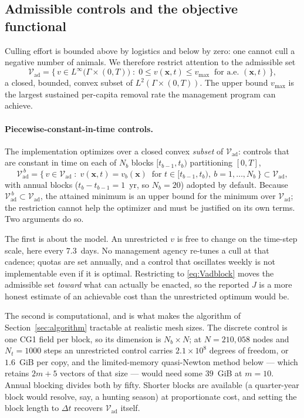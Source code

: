 \documentclass[11pt]{article}
\newcommand{\Vad}{\mathcal{V}_{\mathrm{ad}}}
\begin{document}
\subsection{Admissible controls and the objective functional}

Culling effort is bounded above by logistics and below by zero: one cannot cull a negative number of animals. We therefore restrict attention to the admissible set
\begin{equation}
\Vad = \Big\{\,v\in L^\infty\big(\Gamma\times(0,T)\big)\;:\;0\le v(\mathbf{x},t)\le v_{\max}\ \text{ for a.e. }(\mathbf{x},t)\,\Big\},
\end{equation}
a closed, bounded, convex subset of $L^2(\Gamma\times(0,T))$. The upper bound $v_{\max}$ is the largest sustained per-capita removal rate the management program can achieve.

\paragraph{Piecewise-constant-in-time controls.} The implementation optimizes over a closed convex \emph{subset} of $\Vad$: controls that are constant in time on each of $N_b$ blocks $[t_{b-1},t_b)$ partitioning $[0,T]$,
\begin{equation}
\Vad^{\,b} = \Big\{\,v\in\Vad \;:\; v(\mathbf{x},t) = v_b(\mathbf{x})\ \text{ for } t\in[t_{b-1},t_b),\ b=1,\dots,N_b \,\Big\} \subset \Vad,
\label{eq:Vadblock}
\end{equation}
with annual blocks ($t_b - t_{b-1} = 1$~yr, so $N_b = 20$) adopted by default. Because $\Vad^{\,b}\subset\Vad$, the attained minimum is an upper bound for the minimum over $\Vad$; the restriction cannot help the optimizer and must be justified on its own terms. Two arguments do so.

The first is about the model. An unrestricted $v$ is free to change on the time-step scale, here every $7.3$~days. No management agency re-tunes a cull at that cadence; quotas are set annually, and a control that oscillates weekly is not implementable even if it is optimal. Restricting to \eqref{eq:Vadblock} moves the admissible set \emph{toward} what can actually be enacted, so the reported $J$ is a more honest estimate of an achievable cost than the unrestricted optimum would be.

The second is computational, and is what makes the algorithm of Section~\ref{sec:algorithm} tractable at realistic mesh sizes. The discrete control is one CG1 field per block, so its dimension is $N_b\times N$; at $N = 210{,}058$ nodes and $N_t = 1000$ steps an unrestricted control carries $2.1\times10^8$ degrees of freedom, or $1.6$~GiB per copy, and the limited-memory quasi-Newton method below --- which retains $2m+5$ vectors of that size --- would need some $39$~GiB at $m=10$. Annual blocking divides both by fifty. Shorter blocks are available (a quarter-year block would resolve, say, a hunting season) at proportionate cost, and setting the block length to $\Delta t$ recovers $\Vad$ itself.
\end{document}
